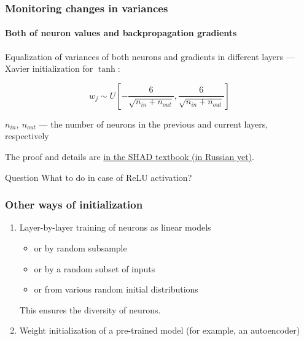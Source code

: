 \documentclass[fullscreen=true, bookmarks=true, hyperref={pdfencoding=unicode}]{beamer}
\begin{document}
\begin{frame}
  \frametitle{Monitoring changes in variances}
     \framesubtitle{Both of neuron values and backpropagation gradients}
   
   Equalization of variances of both neurons and gradients in different layers — Xavier initialization for $\tanh$:

   $$ w_j \sim U \left[ -\frac{{6}}{\sqrt{n_{in}+n_{out}}}, \frac{{6}}{\sqrt{n_{in}+n_ {out}}} \right]$$

   $n_{in},\ n_{out}$ — the number of neurons in the previous and current layers, respectively

   The proof and details are \href{https://ml-handbook.ru/chapters/neural_nets/training}{in the SHAD textbook (in Russian yet)}.
   \pause
   \begin{block}{Question}
   What to do in case of ReLU activation?
   \end{block}
\end{frame}


\begin{frame}
  \frametitle{Other ways of initialization}
   \begin{enumerate}
     \item Layer-by-layer training of neurons as linear models
       \begin{itemize}
         \item or by random subsample
         \item or by a random subset of inputs
         \item or from various random initial distributions
       \end{itemize}

     This ensures the diversity of neurons.

     \item Weight initialization of a pre-trained model (for example, an autoencoder)
   \end{enumerate}
\end{frame}
\end{document}
